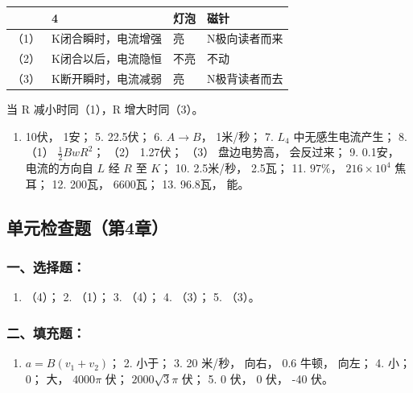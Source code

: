 {\def\LTcaptype{none} %
\begin{longtable}[]{@{}llll@{}}
\toprule\noalign{}
& 4 & 灯泡 & 磁针 \\
\midrule\noalign{}
\endhead
\bottomrule\noalign{}
\endlastfoot
（1） & K闭合瞬时，电流增强 & 亮 & N极向读者而来 \\
（2） & K闭合以后，电流隐恒 & 不亮 & 不动 \\
（3） & K断开瞬时，电流减弱 & 亮 & N极背读者而去 \\
\end{longtable}
}

当 R 减小时同（1），R 增大时同（3）。

\begin{enumerate}
\def\labelenumi{\arabic{enumi}.}
\setcounter{enumi}{3}
\tightlist
\item
  10伏， 1安； 5. 22.5伏； 6. \(A \rightarrow B\)， 1米/秒； 7.
  \(L_{4}\) 中无感生电流产生； 8. （1） \(\frac{1}{2} B w R^{2}\)；
  （2） 1.27伏； （3） 盘边电势高， 会反过来； 9. 0.1安， 电流的方向自
  \(L\) 经 \(R\) 至 \(K\)； 10. 2.5米/秒， 2.5瓦； 11. \(97\%\)，
  \(216 \times 10^{4}\) 焦耳； 12. 200瓦， 6600瓦； 13. 96.8瓦， 能。
\end{enumerate}

\subsection{单元检查题（第4章）}\label{ux5355ux5143ux68c0ux67e5ux9898ux7b2c4ux7ae0-1}

\subsubsection{一、选择题：}\label{ux4e00ux9009ux62e9ux9898-3}

\begin{enumerate}
\def\labelenumi{\arabic{enumi}.}
\tightlist
\item
  （4）； 2. （1）； 3. （4）； 4. （3）； 5. （3）。
\end{enumerate}

\subsubsection{二、填充题：}\label{ux4e8cux586bux5145ux9898-3}

\begin{enumerate}
\def\labelenumi{\arabic{enumi}.}
\tightlist
\item
  \(a = B(v_1 + v_2)\)； 2. 小于； 3. 20 米/秒， 向右， 0.6 牛顿，
  向左； 4. 小； 0； 大， \(4000\pi\) 伏； \(2000\sqrt{3}\pi\) 伏； 5. 0
  伏， 0 伏， -40 伏。
\end{enumerate}

